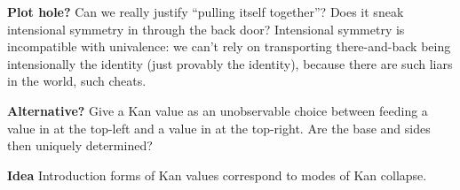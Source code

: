 \documentclass{article}
\begin{document}
\textbf{Plot hole?} Can we really justify ``pulling itself together''?
Does it sneak intensional symmetry in through the back door?
Intensional symmetry is incompatible with univalence: we can't rely
on transporting there-and-back being intensionally the identity (just
provably the identity), because there are such liars in the world,
such cheats.

\textbf{Alternative?} Give a Kan value as an unobservable choice
between feeding a value in at the top-left and a value in at the
top-right. Are the base and sides then uniquely determined?

\textbf{Idea} Introduction forms of Kan values correspond to modes of
Kan collapse.
\end{document}
